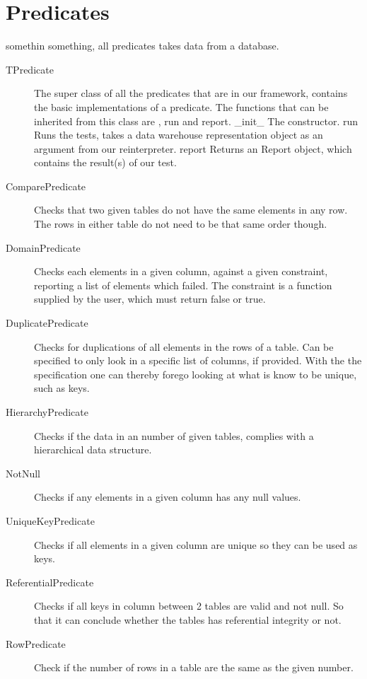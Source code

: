 \section{Predicates}
somethin something, all predicates takes data from a database.

\begin{description}
\item [TPredicate] The super class of all the predicates that are in our framework, contains the basic implementations of a predicate. The functions that can be inherited from this class are , run and report. _init_ The constructor. run Runs the tests, takes a data warehouse representation object as an argument from our reinterpreter. report Returns an Report object, which contains the result(s) of our test.
\item [ComparePredicate] Checks that two given tables do not have the same elements in any row. The rows in either table do not need to be that same order though.
\item [DomainPredicate] Checks each elements in a given column, against a given constraint, reporting a list of elements which failed. The constraint is a function supplied by the user, which must return false or true.
\item [DuplicatePredicate] Checks for duplications of all elements in the rows of a table. Can be specified to only look in a specific list of columns, if provided. With the the specification one can thereby forego looking at what is know to be unique, such as keys.
\item [HierarchyPredicate] Checks if the data in an number of given tables, complies with a hierarchical data structure.
\item [NotNull] Checks if any elements in a given column has any null values.
\item [UniqueKeyPredicate] Checks if all elements in a given column are unique so they can be used as keys.
\item [ReferentialPredicate] Checks if all keys in column between 2 tables are valid and not null. So that it can conclude whether the tables has referential integrity or not.
\item [RowPredicate] Check if the number of rows in a table are the same as the given number.
\end{description}